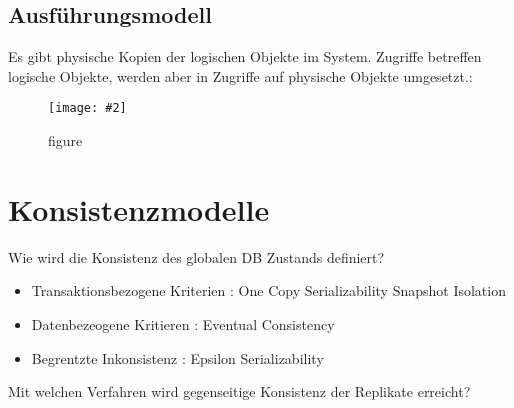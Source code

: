\documentclass[a4paper,10pt,titlepage=false]{scrreprt}
\newcommand{\pic}[2][figure]{\begin{figure}[h]
 \centering
 \texttt{[image: \#2]}
 \caption{#1}
\end{figure}
}
\begin{document}
\subsection{Ausführungsmodell} %
\label{sub:ausf_hrungsmodell}
 Es gibt physische Kopien der logischen Objekte im System. Zugriffe betreffen logische Objekte, werden aber in Zugriffe auf physische Objekte umgesetzt.: \\
 \pic{amodel.png}
\section{Konsistenzmodelle} %
\label{sec:konsistenzmodelle}
Wie wird die Konsistenz des globalen DB Zustands definiert?
\begin{itemize}
  \item Transaktionsbezogene Kriterien :
  \subitem One Copy Serializability
  \subitem Snapshot Isolation
  \item Datenbezeogene Kritieren : Eventual Consistency
  \item Begrentzte Inkonsistenz : Epsilon Serializability
\end{itemize}
Mit welchen Verfahren wird gegenseitige Konsistenz der Replikate erreicht?
\end{document}
